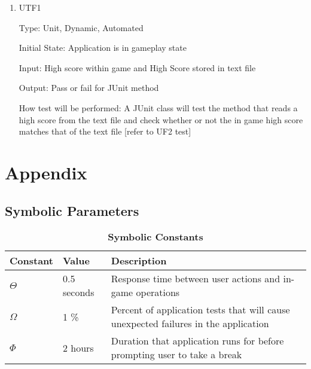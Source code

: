 \documentclass[12pt, titlepage]{article}
\begin{document}
\begin{enumerate}

\item{UTF1\\}

Type: Unit, Dynamic, Automated
					
Initial State: Application is in gameplay state
					
Input: High score within game and High Score stored in text file
					
Output: Pass or fail for JUnit method
					
How test will be performed: A JUnit class will test the method that reads a high score from the text file and check whether or not the in game high score matches that of the text file [refer to UF2 test]

\end{enumerate}	

%

%

\newpage

\section{Appendix}

\subsection{Symbolic Parameters}


\begin{table}[H]
\caption{\bf Symbolic Constants} \label{tab:constants}
\begin{tabularx}{\textwidth}{p{3cm}p{2cm}X}
\toprule {\bf Constant} & {\bf Value} & {\bf Description}\\
\midrule
$\Theta$ & 0.5 seconds & Response time between user actions and in-game operations\\
$\Omega$ & 1 \% & Percent of application tests that will cause unexpected failures in the application\\
$\Phi$ & 2 hours & Duration that application runs for before prompting user to take a break\\
\bottomrule
\end{tabularx}
\end{table}
\end{document}
